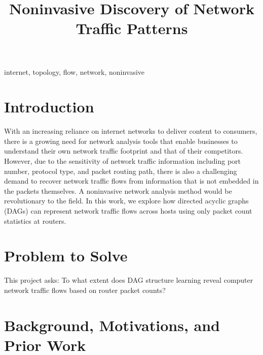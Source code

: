 \documentclass[conference]{IEEEtran}
\begin{document}
\title{Noninvasive Discovery of Network Traffic Patterns\\
}

\author{
\and
{}
}
\maketitle

\begin{abstract}

\end{abstract}

\begin{IEEEkeywords}
internet, topology, flow, network, noninvasive
\end{IEEEkeywords}

\section{Introduction}
With an increasing reliance on internet networks to deliver content to consumers, there is a growing need for network analysis tools that enable businesses to understand their own network traffic footprint and that of their competitors. However, due to the sensitivity of network traffic information including port number, protocol type, and packet routing path, there is also a challenging demand to recover network traffic flows from information that is not embedded in the packets themselves.  A noninvasive network analysis method would be revolutionary to the field. In this work, we explore how directed acyclic graphs (DAGs) can represent network traffic flows across hosts using only packet count statistics at routers.

\section{Problem to Solve}

This project asks: To what extent does DAG structure learning reveal computer network traffic flows based on router packet counts?

\section{Background, Motivations, and Prior Work}
\end{document}
